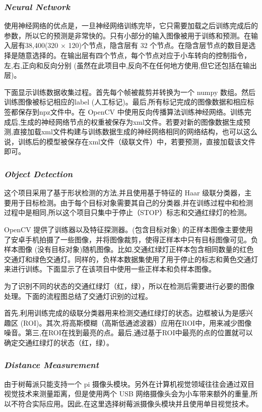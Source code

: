 \documentclass[UTF8,a4paper,cs4size]{ctexart}
\begin{document}
\subsubsection*{\textit{Neural Network}}
使用神经网络的优点是，一旦神经网络训练完毕，它只需要加载之后训练完成后的参数，所以它的预测是非常快的。只有小部分的输入图像被用于训练和预测。在输入层有38,400(320 × 120)个节点，隐含层有 32 个节点。在隐含层节点的数目是选择是随意选择的。在输出层有四个节点，每个节点对应于小车转向的控制指令，左,右,正向和反向分别 (虽然在此项目中,反向不在任何地方使用,但它还包括在输出层)。

下面显示训练数据收集过程。首先每个帧被裁剪并转换为一个 numpy 数组。然后训练图像被标记相应的label (人工标记)。最后,所有标记完成的图像数据和相应标签都保存到npz文件中。在 OpenCV 中使用反向传播算法训练神经网络。训练完成后,生成的神经网络节点的权重被保存为xml文件。若要对新的图像数据生成预测,直接加载xml文件构建与训练数据生成的神经网络相同的网络结构，也可以这么说，训练后的模型被保存在xml文件（级联文件）中，若要预测，直接加载该文件即可。
\subsubsection*{\textit{Object Detection}}
这个项目采用了基于形状检测的方法,并且使用基于特征的 Haar 级联分类器，主要用于目标检测。由于每个目标对象需要其自己的分类器,并在训练过程中和检测过程中是相同,所以这个项目只集中于停止（STOP）标志和交通红绿灯的检测。

OpenCV 提供了训练器以及特征探测器。(包含目标对象) 的正样本图像主要使用了安卓手机拍摄了一些图像，并将图像裁剪，使得正样本中只有目标图像可见。负样本图像 (没有目标对象)随机图像。比如,交通红绿灯正样本包含相同数量的红色交通灯和绿色交通灯。同样的，负样本数据集使用了用于停止的标志和黄色交通灯来进行训练。下面显示了在该项目中使用一些正样本和负样本图像。

为了识别不同的状态的交通红绿灯（红，绿），所以在检测后需要进行必要的图像处理。下面的流程图总结了交通灯识别的过程。

首先,利用训练完成的级联分类器用来检测交通红绿灯的状态。边框被认为是感兴趣区 (ROI)。其次,将高斯模糊（高斯低通滤波器）应用在ROI中，用来减少图像噪音。第三,在ROI在找到最亮的点。最后,通过基于ROI中最亮的点的位置就可以确定交通红绿灯的状态（红，绿）。
\subsubsection*{\textit{Distance Measurement}}
由于树莓派只能支持一个 pi 摄像头模块。另外在计算机视觉领域往往会通过双目视觉技术来测量距离，但是使用两个 USB 网络摄像头会为小车带来额外的重量,所以不符合实际应用。因此,在这里选择树莓派摄像头模块并且使用单目视觉技术。
\end{document}
